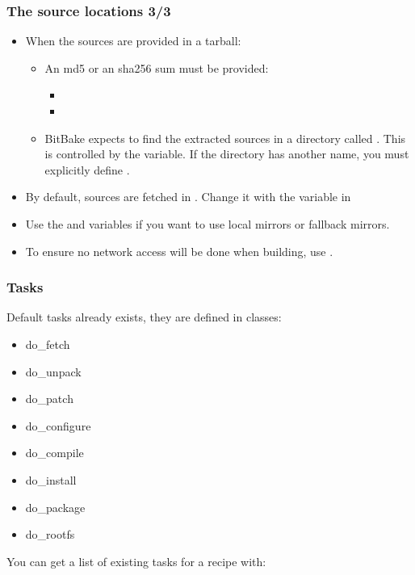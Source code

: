 \begin{frame}
  \frametitle{The source locations 3/3}
  \begin{itemize}
    \item When the sources are provided in a tarball:
      \begin{itemize}
        \item An md5 or an sha256 sum must be provided:
          \begin{itemize}
            \item {}
            \item {}
          \end{itemize}
        \item BitBake expects to find the extracted sources in a
          directory called . This is
          controlled by the  variable. If the directory has
          another name, you must explicitly define .
      \end{itemize}
    \item By default, sources are fetched in
      . Change it with the 
      variable in 
    \item Use the  and  variables if
      you want to use local mirrors or fallback mirrors.
    \item To ensure no network access will be done when building, use
      .
  \end{itemize}
\end{frame}

\begin{frame}[fragile]
  \frametitle{Tasks}
  Default tasks already exists, they are defined in classes:
  \begin{itemize}
    \item do\_fetch
    \item do\_unpack
    \item do\_patch
    \item do\_configure
    \item do\_compile
    \item do\_install
    \item do\_package
    \item do\_rootfs
  \end{itemize}
  You can get a list of existing tasks for a recipe with:
\end{frame}

